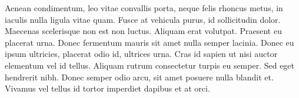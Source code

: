 \documentclass[twoside,12pt,a4paper]{scrbook}
\begin{document}
\begin{pages}
\begin{Rightside}
	Aenean condimentum, leo vitae convallis porta, neque felis rhoncus metus, in iaculis nulla ligula vitae quam. Fusce at vehicula purus, id sollicitudin dolor. Maecenas scelerisque non est non luctus. Aliquam erat volutpat. Praesent eu placerat urna. Donec fermentum mauris sit amet nulla semper lacinia. Donec eu ipsum ultricies, placerat odio id, ultrices urna. Cras id sapien ut nisi auctor elementum vel id tellus. Aliquam rutrum consectetur turpis eu semper. Sed eget hendrerit nibh. Donec semper odio arcu, sit amet posuere nulla blandit et. Vivamus vel tellus id tortor imperdiet dapibus et at orci. 
    
    \endnumbering
  \end{Rightside}
  \Pages

\end{pages}
\end{document}
